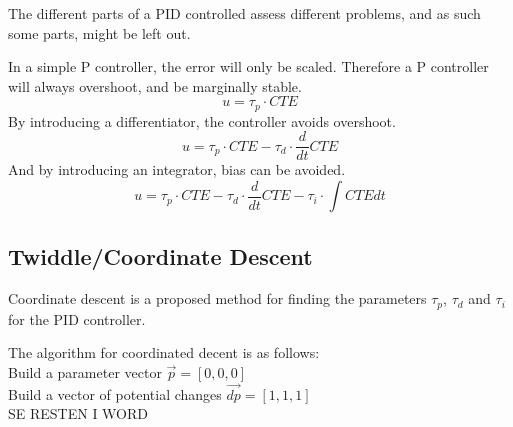 \documentclass[Main]{subfiles}
\begin{document}
The different parts of a PID controlled assess different problems, and as such some parts, might be left out.

In a simple P controller, the error will only be scaled. 
Therefore a P controller will always overshoot, and be marginally stable.
\begin{equation}
	u = \tau_p \cdot CTE
\end{equation}
By introducing a differentiator, the controller avoids overshoot.
\begin{equation}
	u = \tau_p \cdot CTE - \tau_d \cdot \frac{d}{dt} CTE
\end{equation}
And by introducing an integrator, bias can be avoided.
\begin{equation}
	u = \tau_p \cdot CTE - \tau_d \cdot \frac{d}{dt} CTE - \tau_i \cdot \int CTE dt
\end{equation}

\subsection{Twiddle/Coordinate Descent}
Coordinate descent is a proposed method for finding the parameters $\tau_p$, $\tau_d$ and $\tau_i$ for the PID controller.

The algorithm for coordinated decent is as follows:\\
Build a parameter vector $\overrightarrow{p} = [0,0,0]$\\
Build a vector of potential changes $\overrightarrow{dp} = [1,1,1]$\\
SE RESTEN I WORD\\
\end{document}
